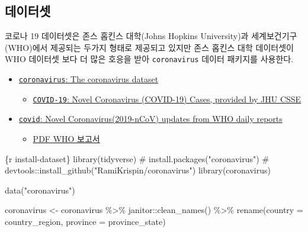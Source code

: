 \documentclass[
  letterpaper,
]{book}
\newenvironment{Shaded}{\begin{snugshade}}{\end{snugshade}}
\newcommand{\InformationTok}[1]{\textcolor[rgb]{0.37,0.37,0.37}{#1}}
\providecommand{\tightlist}{%
  \setlength{\itemsep}{0pt}\setlength{\parskip}{0pt}}\usepackage{longtable,booktabs,array}
\begin{document}
\hypertarget{corona-dashboard-dataset}{%
\subsection{데이터셋}\label{corona-dashboard-dataset}}

코로나 19 데이터셋은 존스 홉킨스 대학(Johns Hopkins University)과
세계보건기구(WHO)에서 제공되는 두가지 형태로 제공되고 있지만 존스 홉킨스
대학 데이터셋이 WHO 데이터셋 보다 더 많은 호응을 받아
\texttt{coronavirus} 데이터 패키지를 사용한다.

\begin{itemize}
\tightlist
\item
  \href{https://github.com/RamiKrispin/coronavirus}{\texttt{coronavirus}:
  The coronavirus dataset}

  \begin{itemize}
  \tightlist
  \item
    \href{https://github.com/CSSEGISandData/COVID-19}{\texttt{COVID-19}:
    Novel Coronavirus (COVID-19) Cases, provided by JHU CSSE}
  \end{itemize}
\item
  \href{https://github.com/javierluraschi/covid}{\texttt{covid}: Novel
  Coronavirus(2019-nCoV) updates from WHO daily reports}

  \begin{itemize}
  \tightlist
  \item
    \href{https://www.who.int/emergencies/diseases/novel-coronavirus-2019/situation-reports}{PDF
    WHO 보고서}
  \end{itemize}
\end{itemize}

\begin{Shaded}
\begin{Highlighting}[]
\InformationTok{\textasciigrave{}\textasciigrave{}\textasciigrave{}\{r install{-}dataset\}}
\InformationTok{library(tidyverse)}
\InformationTok{\# install.packages("coronavirus") }
\InformationTok{\# devtools::install\_github("RamiKrispin/coronavirus")}
\InformationTok{library(coronavirus)}

\InformationTok{data("coronavirus")}

\InformationTok{coronavirus \textless{}{-} coronavirus \%\textgreater{}\% }
\InformationTok{  janitor::clean\_names() \%\textgreater{}\% }
\InformationTok{  rename(country = country\_region,}
\InformationTok{         province = province\_state)}
\InformationTok{\textasciigrave{}\textasciigrave{}\textasciigrave{}}
\end{Highlighting}
\end{Shaded}
\end{document}
